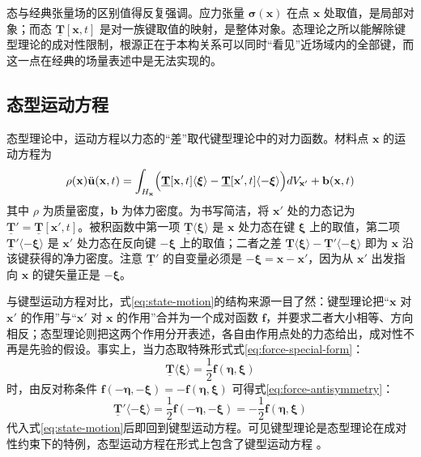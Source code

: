 \begin{remark}
  态与经典张量场的区别值得反复强调。应力张量 $\boldsymbol{\sigma}(\mathbf{x})$ 在点 $\mathbf{x}$ 处取值，是局部对象；而态 $\underline{\mathbf{T}}[\mathbf{x},t]$ 是对一族键取值的映射，是整体对象。态理论之所以能解除键型理论的成对性限制，根源正在于本构关系可以同时“看见”近场域内的全部键，而这一点在经典的场量表述中是无法实现的。
\end{remark}

\subsection{态型运动方程}\label{sec:state-motion}

态型理论中，运动方程以力态的“差”取代键型理论中的对力函数。材料点 $\mathbf{x}$ 的运动方程为
\begin{equation}
  \rho(\mathbf{x})\ddot{\mathbf{u}}(\mathbf{x},t)=\int_{H_{\mathbf{x}}}\Bigl(\underline{\mathbf{T}}[\mathbf{x},t]\langle\boldsymbol{\xi}\rangle-\underline{\mathbf{T}}[\mathbf{x}',t]\langle-\boldsymbol{\xi}\rangle\Bigr)dV_{\mathbf{x}'}+\mathbf{b}(\mathbf{x},t)
  \label{eq:state-motion}
\end{equation}
其中 $\rho$ 为质量密度，$\mathbf{b}$ 为体力密度。为书写简洁，将 $\mathbf{x}'$ 处的力态记为 $\underline{\mathbf{T}}'=\underline{\mathbf{T}}[\mathbf{x}',t]$。被积函数中第一项 $\underline{\mathbf{T}}\langle\boldsymbol{\xi}\rangle$ 是 $\mathbf{x}$ 处力态在键 $\boldsymbol{\xi}$ 上的取值，第二项 $\underline{\mathbf{T}}'\langle-\boldsymbol{\xi}\rangle$ 是 $\mathbf{x}'$ 处力态在反向键 $-\boldsymbol{\xi}$ 上的取值；二者之差 $\underline{\mathbf{T}}\langle\boldsymbol{\xi}\rangle-\underline{\mathbf{T}}'\langle-\boldsymbol{\xi}\rangle$ 即为 $\mathbf{x}$ 沿该键获得的净力密度。注意 $\underline{\mathbf{T}}'$ 的自变量必须是 $-\boldsymbol{\xi}=\mathbf{x}-\mathbf{x}'$，因为从 $\mathbf{x}'$ 出发指向 $\mathbf{x}$ 的键矢量正是 $-\boldsymbol{\xi}$。

与键型运动方程对比，式\eqref{eq:state-motion}的结构来源一目了然：键型理论把“$\mathbf{x}$ 对 $\mathbf{x}'$ 的作用”与“$\mathbf{x}'$ 对 $\mathbf{x}$ 的作用”合并为一个成对函数 $\mathbf{f}$，并要求二者大小相等、方向相反；态型理论则把这两个作用分开表述，各自由作用点处的力态给出，成对性不再是先验的假设。事实上，当力态取特殊形式式\eqref{eq:force-special-form}：
\begin{equation}
  \underline{\mathbf{T}}\langle\boldsymbol{\xi}\rangle=\frac{1}{2}\mathbf{f}(\boldsymbol{\eta},\boldsymbol{\xi})
  \label{eq:force-special-form}
\end{equation}
时，由反对称条件 $\mathbf{f}(-\boldsymbol{\eta},-\boldsymbol{\xi})=-\mathbf{f}(\boldsymbol{\eta},\boldsymbol{\xi})$ 可得式\eqref{eq:force-antisymmetry}：
\begin{equation}
  \underline{\mathbf{T}}'\langle-\boldsymbol{\xi}\rangle=\frac{1}{2}\mathbf{f}(-\boldsymbol{\eta},-\boldsymbol{\xi})=-\frac{1}{2}\mathbf{f}(\boldsymbol{\eta},\boldsymbol{\xi})
  \label{eq:force-antisymmetry}
\end{equation}
代入式\eqref{eq:state-motion}后即回到键型运动方程。可见键型理论是态型理论在成对性约束下的特例，态型运动方程在形式上包含了键型运动方程 \cite{Silling2007}。

